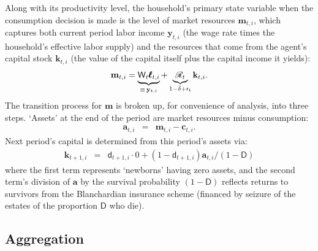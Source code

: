 \documentclass[titlepage]{./econtex}
\begin{document}
Along with its productivity level, the household's primary state variable when the consumption decision is made is the level of market resources $\mathbf{m}_{t,i}$, which captures both current period labor income $\mathbf{y}_{t,i}$ (the wage rate times the household's effective labor supply) and the resources that come from the agent's capital stock $\mathbf{k}_{t,i}$ (the value of the capital itself plus the capital income it yields):
\begin{equation}
  \mathbf{m}_{t,i} = \underbrace{{\bf \mathsf{W}}_{t} \pmb{\ell}_{t,i}}_{\equiv\,\mathbf{y}_{t,i}} + \underbrace{{\mathscr{R}}_t}_{1-\delta+\mathsf{r}_{t}} \mathbf{k}_{t,i}.
\label{eq:mDef}
\end{equation}
 The transition process for $\mathbf{m}$ is broken up, for convenience
of analysis, into three steps.  `Assets' at the end of the period are
market resources minus consumption:
\begin{eqnarray}
   \mathbf{a}_{t,i} & = & \mathbf{m}_{t,i}-\mathbf{c}_{t,i}. \label{eq:aDef}
\end{eqnarray}
 Next period's capital is determined from this period's assets via:
\begin{eqnarray}
\mathbf{k}_{t+1,i} & = & \mathsf{d}_{t+1,i} \cdot 0+ (1-\mathsf{d}_{t+1,i})\mathbf{a}_{t,i} \big/(1-\mathsf{D}) \label{eq:ktp1icompact}
\end{eqnarray}
where the first term represents `newborns' having zero assets, and the second term's division of $\mathbf{a}$ by the survival probability $(1-\mathsf{D})$ reflects returns to survivors from the Blanchardian insurance scheme (financed by seizure of the estates of the proportion $\mathsf{D}$ who die).


\subsection{Aggregation}
\end{document}
